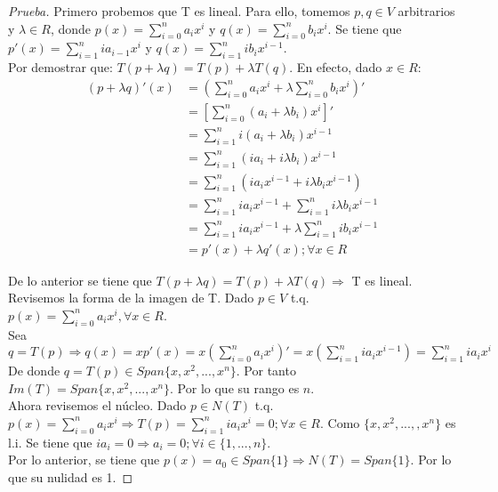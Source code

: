 \documentclass[12pt]{article}
\begin{document}
\begin{proof}[Prueba]
Primero probemos que T es lineal. Para ello, tomemos $p, q \in V$ arbitrarios y $\lambda \in R$, donde $p(x)=\sum_{i=0}^{n} a_{i}x^{i}$ y $q(x)=\sum_{i=0}^{n} b_{i}x^{i}$. Se tiene que $p'(x)=\sum_{i=1}^{n} ia_{i-1}x^{i}$ y $q(x)=\sum_{i=1}^{n} ib_{i}x^{i-1}$.\\
Por demostrar que: $T(p + \lambda q) = T(p) + \lambda T(q)$. En efecto, dado $x \in R$:\\

\begin{align*}
(p + \lambda q)'(x) & = (\sum_{i=0}^{n} a_{i}x^{i} + \lambda \sum_{i=0}^{n} b_{i}x^{i})'\\
& = [\sum_{i=0}^{n} (a_{i} + \lambda b_{i})x^{i}]'\\
& = \sum_{i=1}^{n} i(a_{i} + \lambda b_{i})x^{i-1}\\
& = \sum_{i=1}^{n} (ia_{i} + i\lambda b_{i})x^{i-1}\\
& = \sum_{i=1}^{n} (ia_{i}x^{i-1} + i\lambda b_{i}x^{i-1})\\
& = \sum_{i=1}^{n}ia_{i}x^{i-1} + \sum_{i=1}^{n}i\lambda b_{i}x^{i-1}\\
& = \sum_{i=1}^{n}ia_{i}x^{i-1} + \lambda \sum_{i=1}^{n}i b_{i}x^{i-1}\\
& = p'(x) + \lambda q'(x); \forall x \in R
\end{align*}

De lo anterior se tiene que $T(p + \lambda q) = T(p) + \lambda T(q) \Longrightarrow$ T es lineal.\\

Revisemos la forma de la imagen de T. Dado $p \in V$ t.q. $p(x)=\sum_{i=0}^{n}a_{i}x^{i}, \forall x \in R$. \\
Sea $q=T(p) \Longrightarrow q(x)=xp'(x)=x(\sum_{i=0}^{n}a_{i}x^{i})'= 
	  x(\sum_{i=1}^{n}ia_{i}x^{i-1})=\sum_{i=1}^{n}ia_{i}x^{i}$\\
De donde $q=T(p) \in Span\{x, x^{2}, ..., x^{n}\}$. Por tanto $Im(T)=Span\{x, x^{2}, ..., x^{n}\}$. Por lo que su rango es $n$.\\

Ahora revisemos el núcleo. Dado $p \in N(T)$ t.q. $p(x) = \sum_{i=0}^{n}a_{i}x^{i} \Longrightarrow 
T(p)=\sum_{i=1}^{n}ia_{i}x^{i}= 0; \forall x \in R$. Como $\{x, x^{2}, ..., , x^{n}\}$ es l.i. Se tiene que $ia_{i}=0 \Longrightarrow a_{i}=0; \forall i \in \{1,...,n\}$.\\
Por lo anterior, se tiene que $p(x)=a_{0} \in Span\{1\} \Longrightarrow N(T)=Span\{1\}$. Por lo que su nulidad es 1.
\end{proof}
\end{document}
